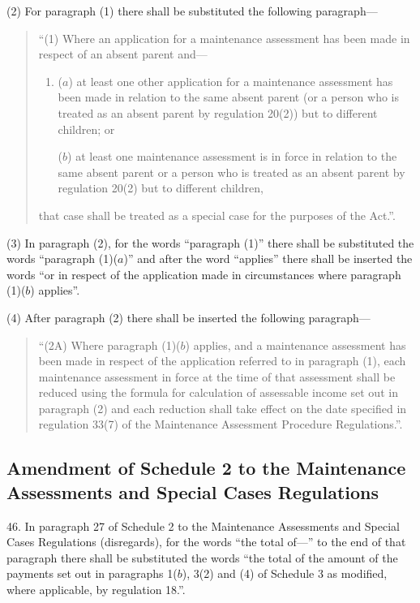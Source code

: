 \documentclass[a4paper]{article}
\begin{document}
(2) For paragraph (1) there shall be substituted the following paragraph—
\begin{quotation}
“(1) Where an application for a maintenance assessment has been made in respect of an absent parent and—
\begin{enumerate}\item[]
($a$) at least one other application for a maintenance assessment has been made in relation to the same absent parent (or a person who is treated as an absent parent by regulation 20(2)) but to different children; or

($b$) at least one maintenance assessment is in force in relation to the same absent parent or a person who is treated as an absent parent by regulation 20(2) but to different children,
\end{enumerate}
that case shall be treated as a special case for the purposes of the Act.”.
\end{quotation}

(3) In paragraph (2), for the words “paragraph (1)” there shall be substituted the words “paragraph (1)($a$)” and after the word “applies” there shall be inserted the words “or in respect of the application made in circumstances where paragraph (1)($b$) applies”.

(4) After paragraph (2) there shall be inserted the following paragraph—
\begin{quotation}
“(2A) Where paragraph (1)($b$) applies, and a maintenance assessment has been made in respect of the application referred to in paragraph (1), each maintenance assessment in force at the time of that assessment shall be reduced using the formula for calculation of assessable income set out in paragraph (2) and each reduction shall take effect on the date specified in regulation 33(7) of the Maintenance Assessment Procedure Regulations.”.
\end{quotation}

\subsection[46. Amendment of Schedule 2 to the Maintenance Assessments and Special Cases Regulations]{Amendment of Schedule 2 to the Maintenance Assessments and Special Cases Regulations}

46.  In paragraph 27 of Schedule 2 to the Maintenance Assessments and Special Cases Regulations (disregards), for the words “the total of—” to the end of that paragraph there shall be substituted the words “the total of the amount of the payments set out in paragraphs 1($b$), 3(2) and (4) of Schedule 3 as modified, where applicable, by regulation 18.”.
\end{document}
